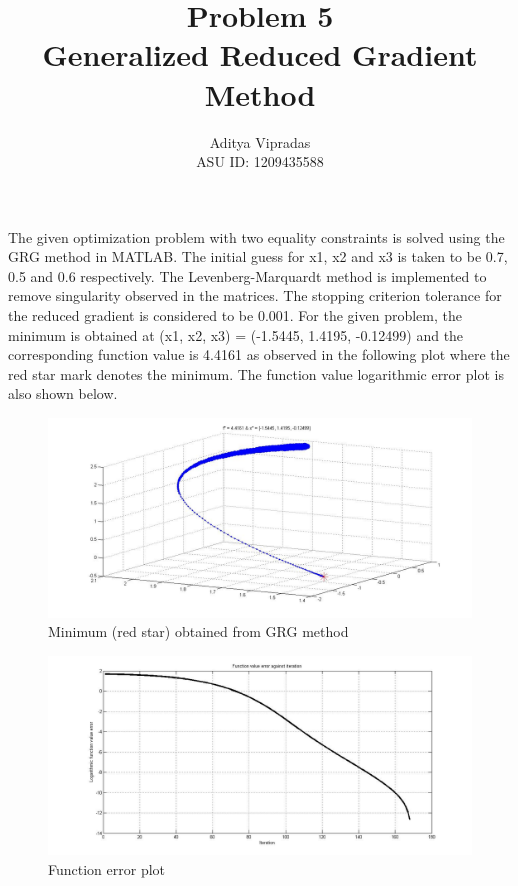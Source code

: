 \documentclass[12pt]{article}
\title{\textbf{Problem 5\\Generalized Reduced Gradient Method}}
\author{Aditya Vipradas\\ASU ID: 1209435588}
\begin{document}
\maketitle
The given optimization problem with two equality constraints is solved using the GRG method in MATLAB. The initial guess for x1, x2 and x3 is taken to be 0.7, 0.5 and 0.6 respectively. The Levenberg-Marquardt method is implemented to remove singularity observed in the matrices. The stopping criterion tolerance for the reduced gradient is considered to be 0.001. For the given problem, the minimum is obtained at (x1, x2, x3) = (-1.5445, 1.4195, -0.12499) and the corresponding function value is 4.4161 as observed in the following plot where the red star mark denotes the minimum. The function value logarithmic error plot is also shown below.
\begin{figure}[H]
\begin{center}
\includegraphics[scale=0.4]{2.jpg}
\caption{Minimum (red star) obtained from GRG method}  
\end{center}
\end{figure}
\begin{figure}[H]
\begin{center}
\includegraphics[scale=0.4]{1.jpg}
\caption{Function error plot}  
\end{center}
\end{figure}
\end{document}
